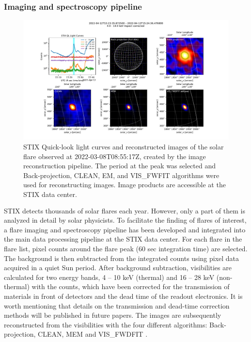 \documentclass[referee]{aa} %
\begin{document}
\subsubsection{Imaging and spectroscopy pipeline}
\begin{figure}
  \centering
  \includegraphics[width=0.95\linewidth]{figures/imaging_pipeline.pdf}
  \caption{ 
   STIX Quick-look light curves and reconstructed images of the solar flare observed at 2022-03-08T08:55:17Z, 
   created by the image reconstruction pipeline.  The period at the peak was selected and 
   Back-projection, CLEAN, EM, and VIS\_FWFIT
    algorithms were used for reconstructing images. Image products are accessible
   at the STIX data center.}
  \label{fig:imaging}
\end{figure}
STIX detects thousands of solar flares each year. However, only
 a part of them is analyzed in detail by solar physicists. 
To facilitate the finding of flares of interest, a flare imaging and spectroscopy pipeline has been developed and integrated into the main data processing pipeline at the STIX data center.  
For each flare in the flare list, pixel counts around the flare peak (60 sec integration time) are selected. The background is then subtracted from the integrated counts using pixel data acquired in a quiet Sun period.  
After background subtraction, visibilities are calculated for two energy bands, 4 -- 10 keV (thermal) and 16 -- 28 keV (non-thermal) with the counts, which have been corrected for the transmission of materials in front of detectors and the dead time of the readout electronics. It is worth mentioning that details on the transmission and dead-time correction methods will be published in future papers. 
The images are subsequently reconstructed from the visibilities 
with the four different algorithms: Back-projection, CLEAN, 
MEM and VIS\_FWDFIT \cite{paolo2020,clean, mem}.
\end{document}
